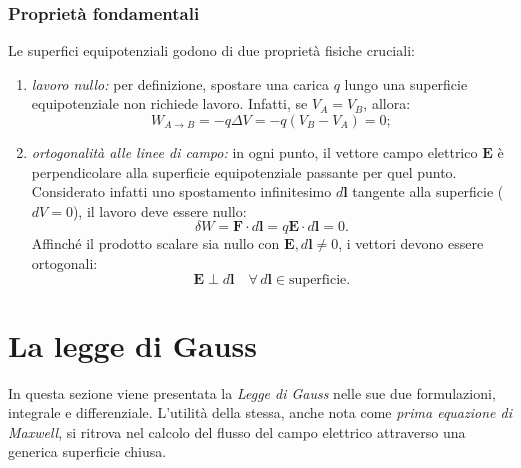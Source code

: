 \documentclass[a4paper,11pt]{report}
\begin{document}
\begin{approfondimento}[title={Superfici (o Linee) Equipotenziali}]
\begin{center}
    \label{fig:equipotenziali}
\end{center}

\bigskip %

\subsubsection{Proprietà fondamentali}
Le superfici equipotenziali godono di due proprietà fisiche cruciali:

\begin{enumerate}
    \item \textit{lavoro nullo:} per definizione, spostare una carica $q$ lungo una superficie equipotenziale non richiede lavoro. Infatti, se $V_A = V_B$, allora:
    \begin{equation}
        W_{A \to B} = -q \Delta V = -q(V_B - V_A) = 0;
    \end{equation}
    
    \item \textit{ortogonalità alle linee di campo:} in ogni punto, il vettore campo elettrico $\bm{E}$ è perpendicolare alla superficie equipotenziale passante per quel punto. Considerato infatti uno spostamento infinitesimo $d\bm{l}$ tangente alla superficie ($dV=0$), il lavoro deve essere nullo:
    \begin{equation}
        \delta W = \bm{F} \cdot d\bm{l} = q \bm{E} \cdot d\bm{l} = 0.
    \end{equation}
    Affinché il prodotto scalare sia nullo con $\bm{E}, d\bm{l} \neq 0$, i vettori devono essere ortogonali:
    \begin{equation}
        \bm{E} \perp d\bm{l} \quad \forall \, d\bm{l} \in \text{superficie}.
    \end{equation}
\end{enumerate}
\end{approfondimento}

\section{La legge di Gauss}
In questa sezione viene presentata la \textit{Legge di Gauss} nelle sue due formulazioni, integrale e differenziale. L'utilità della stessa, anche nota come \textit{prima equazione di Maxwell}, si ritrova nel calcolo del flusso del campo elettrico attraverso una generica superficie chiusa.
\end{document}
